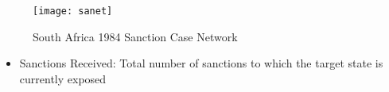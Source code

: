 \begin{figure}[ht]
	\centering
	\texttt{[image: sanet]}
	\caption{South Africa 1984 Sanction Case Network}
	\label{fig:sanet}
\end{figure}
\FloatBarrier

	\begin{itemize}
		\item Sanctions Received: Total number of sanctions to which the target state is currently exposed
	\end{itemize}





